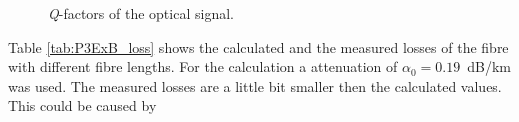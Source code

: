 {\begin{figure}%
\centering
\caption{\textit{Q}-factors of the optical signal.}
\label{fig:P3_Q}%
\end{figure}

Table \ref{tab:P3ExB_loss} shows the calculated and the measured losses of the fibre with different fibre lengths. For the calculation a attenuation of $\alpha_0=0.19$~dB/km was used. The measured losses are a little bit smaller then the calculated values. This could be caused by 

}
